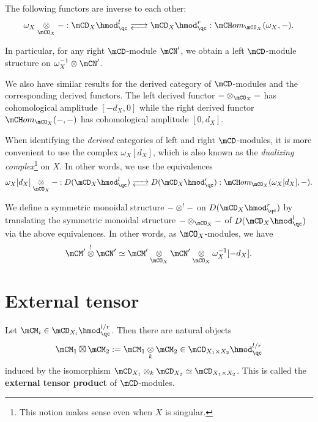	\begin{cor}
		The following functors are inverse to each other:
		\[
			\omega_X \ot_{\mCO_X} - : \mCD_X\hmod_\qc^{l} \adj \mCD_X\hmod_\qc^{r} : \mCH om_{\mCO_X}(\omega_X,-).
		\]
	\end{cor}

	\begin{rem}
		In particular, for any right $\mCD$-module $\mCN'$, we obtain a left $\mCD$-module structure on $\omega_X^{-1} \ot \mCN'$.
	\end{rem}


	\begin{rem}
		We also have similar results for the derived category of $\mCD$-modules and the corresponding derived functors. The left derived functor $-\ot_{\mCO_X}-$ has cohomological amplitude $[-d_X,0]$ while the right derived functor $\mCH om_{\mCO_X}(-,-)$ has cohomological amplitude $[0,d_X]$.
	\end{rem}


	\begin{rem}
		When identifying the \emph{derived} categories of left and right $\mCD$-modules, it is more convenient to use the complex $\omega_X[d_X]$, which is also known as the \emph{dualizing complex}\footnote{This notion makes sense even when $X$ is singular.} on $X$. In other words, we use the equivalences
		\[
			\omega_X[d_X] \ot_{\mCO_X} - : D(\mCD_X\hmod_\qc^{l}) \adj D(\mCD_X\hmod_\qc^{r}) : \mCH om_{\mCO_X}(\omega_X[d_X],-).
		\]		
	\end{rem}


	\begin{constr}
		We define a symmetric monoidal structure $-\ot^! - $ on $D(\mCD_X\hmod_\qc^{r})$ by translating the symmetric monoidal structure $-\ot_{\mCO_X} - $ of $D(\mCD_X\hmod_\qc^{l})$ via the above equivalences. In other words, as $\mCO_X$-modules, we have
		\[
			\mCM' \ot^! \mCN' \simeq \mCM' \ot_{\mCO_X} \mCN' \ot_{\mCO_X} \omega_X^{-1}[-d_X].
		\]

	\end{constr}

\section{External tensor}
	\begin{constr}
		\label{constr-external}
		Let $\mCM_i \in \mCD_{X_i}\hmod_\qc^{l/r}$. Then there are natural objects
		\[
			\mCM_1 \boxt \mCM_2:=\mCM_1 \ot_{k} \mCM_2 \in \mCD_{X_1\mt X_2}\hmod_\qc^{l/r}
		\]
		induced by the isomorphism $\mCD_{X_1}\ot_k \mCD_{X_2} \simeq \mCD_{X_1\mt X_2}$. This is called the \textbf{external tensor product} of $\mCD$-modules.
		
	\end{constr}
	

